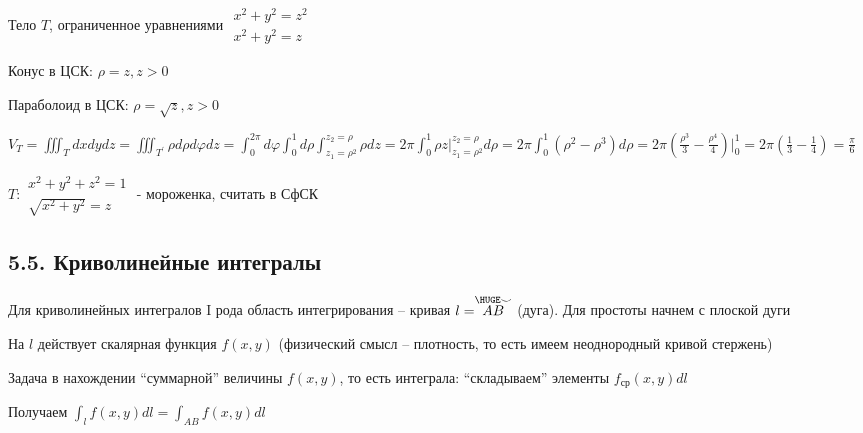 \documentclass[12pt]{article}
\begin{document}
    \Ex Тело $T$, ограниченное уравнениями $\begin{matrix}x^2 + y^2 = z^2 \\ x^2 + y^2 = z\end{matrix}$

    Конус в ЦСК: $\rho = z, z > 0$

    Параболоид в ЦСК: $\rho = \sqrt{z}, z > 0$

    $V_T = \iiint_T dxdydz = \iiint_{T^\prime}\rho d\rho d\varphi dz = \int_0^{2\pi} d\varphi \int_0^1 d \rho \int_{z_1 = \rho^2}^{z_2=\rho} \rho dz =
    2\pi \int_0^1 \rho z \Big|_{z_1 = \rho^2}^{z_2=\rho} d\rho = 2\pi \int_0^1 (\rho^2 - \rho^3) d\rho =
    2\pi \left(\frac{\rho^3}{3} - \frac{\rho^4}{4}\right) \Big|_0^1 = 2\pi \left(\frac{1}{3} - \frac{1}{4}\right) = \frac{\pi}{6}$

    \Lab $T: \begin{matrix}x^2 + y^2 + z^2 = 1 \\ \sqrt{x^2 + y^2} = z\end{matrix}$ - мороженка, считать в СфСК


    \subsection{5.5. Криволинейные интегралы}

    \hypertarget{curvilinearintegraloffirstkind}{}

    Для криволинейных интегралов I рода область интегрирования -- кривая $l = \stackrel{\HUGE\smile}{AB}$ (дуга). Для простоты начнем с плоской дуги

    На $l$ действует скалярная функция $f(x, y)$ (физический смысл -- плотность, то есть имеем неоднородный кривой стержень)

    Задача в нахождении \enquote{суммарной} величины $f(x, y)$, то есть интеграла: \enquote{складываем} элементы $f_{\text{ср}}(x, y) dl$

    Получаем $\int_l f(x, y)dl = \int_{AB} f(x, y)dl$
\end{document}
